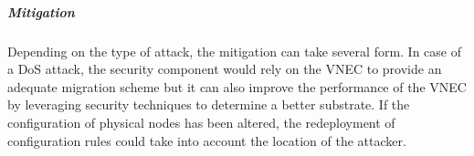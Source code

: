 \subparagraph{Mitigation}
Depending on the type of attack, the mitigation can take several form. 
In case of a DoS attack, the security component would rely on the VNEC to provide an adequate migration scheme but it can also improve the performance of the VNEC by leveraging security techniques to determine a better substrate. 
If the configuration of physical nodes has been altered, the redeployment of configuration rules could take into account the location of the attacker.





